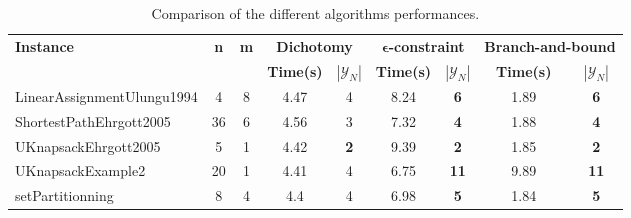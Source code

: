 \begin{table}[!h]
\centering
\hspace*{-1cm}\begin{tabular}{lcccccccc}
\toprule
\textbf{Instance} & \textbf{n} & \textbf{m} & \multicolumn{2}{c}{\textbf{Dichotomy}} & \multicolumn{2}{c}{\textbf{$\mathbf{\epsilon}$-constraint}}  & \multicolumn{2}{c}{\textbf{Branch-and-bound}}
\\
\cmidrule(r){4-5} \cmidrule(r){6-7} \cmidrule(r){8-9}
~ & ~ & ~ & \textbf{Time(s)} & \textbf{$|\mathcal{Y}_N|$} & \textbf{Time(s)} & \textbf{$|\mathcal{Y}_N|$} & \textbf{Time(s)} & \textbf{$|\mathcal{Y}_N|$} \\
\midrule

LinearAssignmentUlungu1994 & 4 & 8 & 4.47 & 4 & 8.24 &  \textbf{6} &  \textcolor{blue2}{1.89} &  \textbf{6} \\
ShortestPathEhrgott2005 & 36 & 6 & 4.56 & 3 & 7.32 &  \textbf{4} &  \textcolor{blue2}{1.88} &  \textbf{4} \\
UKnapsackEhrgott2005 & 5 & 1 & 4.42 &  \textbf{2} & 9.39 &  \textbf{2} &  \textcolor{blue2}{1.85} &  \textbf{2} \\
UKnapsackExample2 & 20 & 1 &  \textcolor{blue2}{4.41} & 4 & 6.75 &  \textbf{11} & 9.89 &  \textbf{11} \\
setPartitionning & 8 & 4 & 4.4 & 4 & 6.98 &  \textbf{5} &  \textcolor{blue2}{1.84} &  \textbf{5} \\
\bottomrule
\end{tabular}
\caption{Comparison of the different algorithms performances.}
\label{tab:table_compare}
\end{table}


